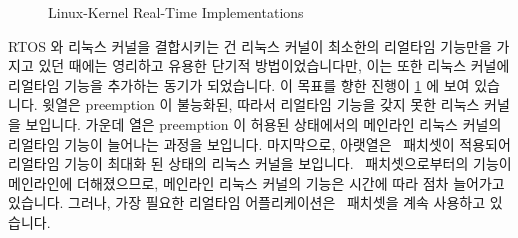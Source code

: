 \fi

\begin{figure}[p]
\centering
{}
\caption{Linux-Kernel Real-Time Implementations}
\label{fig:advsync:Linux-Kernel Real-Time Implementations}
\end{figure}

RTOS 와 리눅스 커널을 결합시키는 건 리눅스 커널이 최소한의 리얼타임 기능만을
가지고 있던 때에는 영리하고 유용한 단기적 방법이었습니다만, 이는 또한 리눅스
커널에 리얼타임 기능을 추가하는 동기가 되었습니다.
이 목표를 향한 진행이
\cref{fig:advsync:Linux-Kernel Real-Time Implementations} 에 보여 있습니다.
윗열은 preemption 이 불능화된, 따라서 리얼타임 기능을 갖지 못한 리눅스 커널을
보입니다.
가운데 열은 preemption 이 허용된 상태에서의 메인라인 리눅스 커널의 리얼타임
기능이 늘어나는 과정을 보입니다.
마지막으로, 아랫열은 \rt\ 패치셋이 적용되어 리얼타임 기능이 최대화 된 상태의
리눅스 커널을 보입니다.
\rt\ 패치셋으로부터의 기능이 메인라인에 더해졌으므로, 메인라인 리눅스 커널의
기능은 시간에 따라 점차 늘어가고 있습니다.
그러나, 가장 필요한 리얼타임 어플리케이션은 \rt\ 패치셋을 계속 사용하고
있습니다.

